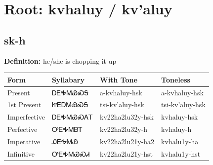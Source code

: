 \documentclass{article}%
\begin{document}
%
\normalsize%
\section*{Root: kvhaluy / kv'aluy}%
\subsection*{sk-h}%
\textbf{Definition: }%
he/she is chopping it up%
\\[0.5em]%
\begin{tabular}{|l|l|l|l|}%
\hline%
\textbf{Form}&\textbf{Syllabary}&\textbf{With Tone}&\textbf{Toneless}\\%
\hline%
Present&ᎠᎬᎭᎷᏯᏍᎦ&a{-}kvhaluy{-}hsk&a{-}kvhaluy{-}hsk\\%
1st Present&ᏥᎬᎠᎷᏯᏍᎦ&tsi{-}kv'aluy{-}hsk&tsi{-}kv'aluy{-}hsk\\%
Imperfective&ᎠᎬᎭᎷᏯᏍᎪᎢ&kv22ha2lu32y{-}hsk&kvhaluy{-}hsk\\%
Perfective&ᎤᎬᎭᎷᏴᎢ&kv22ha2lu32y{-}h&kvhaluy{-}h\\%
Imperative&ᎯᎬᎭᎷᏯ&kv22ha2lu21y{-}ha2&kvhalu1y{-}ha\\%
Infinitive&ᎤᎬᎭᎷᏯᏍᏗ&kv22ha2lu21y{-}hst&kvhalu1y{-}hst\\%
\hline%
\end{tabular}%
\\[1em]%
\end{document}
